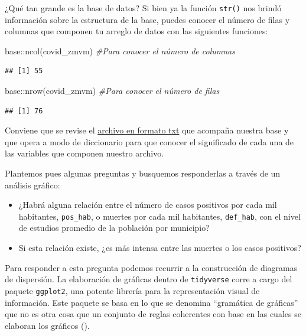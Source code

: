 \documentclass[
  11pt,
  oneside]{book}
\newenvironment{Shaded}{\begin{snugshade}}{\end{snugshade}}
\newcommand{\CommentTok}[1]{\textcolor[rgb]{0.56,0.35,0.01}{\textit{#1}}}
\newcommand{\FunctionTok}[1]{\textcolor[rgb]{0.00,0.00,0.00}{#1}}
\newcommand{\NormalTok}[1]{#1}
\newcommand{\SpecialCharTok}[1]{\textcolor[rgb]{0.00,0.00,0.00}{#1}}
\providecommand{\tightlist}{%
  \setlength{\itemsep}{0pt}\setlength{\parskip}{0pt}}
\begin{document}
¿Qué tan grande es la base de datos? Si bien ya la función \texttt{str()} nos brindó información sobre la estructura de la base, puedes conocer el número de filas y columnas que componen tu arreglo de datos con las siguientes funciones:

\begin{Shaded}
\begin{Highlighting}[]
\NormalTok{base}\SpecialCharTok{::}\FunctionTok{ncol}\NormalTok{(covid\_zmvm) }\CommentTok{\#Para conocer el número de columnas}
\end{Highlighting}
\end{Shaded}

\begin{verbatim}
## [1] 55
\end{verbatim}

\begin{Shaded}
\begin{Highlighting}[]
\NormalTok{base}\SpecialCharTok{::}\FunctionTok{nrow}\NormalTok{(covid\_zmvm) }\CommentTok{\#Para conocer el número de filas}
\end{Highlighting}
\end{Shaded}

\begin{verbatim}
## [1] 76
\end{verbatim}

Conviene que se revise el \href{https://bit.ly/diccionario_covid_zmvm}{archivo en formato txt} que acompaña nuestra base y que opera a modo de diccionario para que conocer el significado de cada una de las variables que componen nuestro archivo.

Plantemos pues algunas preguntas y busquemos responderlas a través de un análisis gráfico:

\begin{itemize}
\tightlist
\item
  ¿Habrá alguna relación entre el número de casos positivos por cada mil habitantes, \texttt{pos\_hab}, o muertes por cada mil habitantes, \texttt{def\_hab}, con el nivel de estudios promedio de la población por municipio?
\item
  Si esta relación existe, ¿es más intensa entre las muertes o los casos positivos?
\end{itemize}

Para responder a esta pregunta podemos recurrir a la construcción de diagramas de dispersión. La elaboración de gráficas dentro de \texttt{tidyverse} corre a cargo del paquete \texttt{ggplot2}, una potente librería para la representación visual de información. Este paquete se basa en lo que se denomina ``gramática de gráficas'' que no es otra cosa que un conjunto de reglas coherentes con base en las cuales se elaboran los gráficos (\citet{Wickham2016}).
\end{document}
